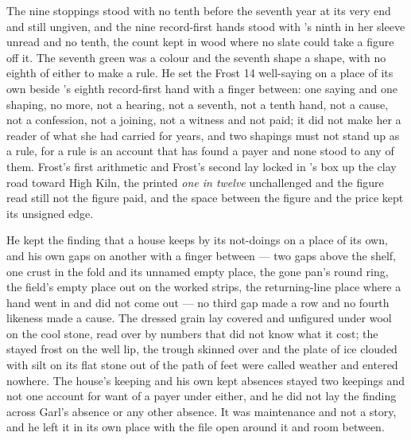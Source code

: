The nine stoppings stood with no tenth before the seventh year at its very end and still ungiven, and the nine record-first hands stood with 's ninth in her sleeve unread and no tenth, the count kept in wood where no slate could take a figure off it. The seventh green was a colour and the seventh shape a shape, with no eighth of either to make a rule. He set the Frost 14 well-saying on a place of its own beside 's eighth record-first hand with a finger between: one saying and one shaping, no more, not a hearing, not a seventh, not a tenth hand, not a cause, not a confession, not a joining, not a witness and not paid; it did not make her a reader of what she had carried for years, and two shapings must not stand up as a rule, for a rule is an account that has found a payer and none stood to any of them. Frost's first arithmetic and Frost's second lay locked in 's box up the clay road toward High Kiln, the printed \emph{one in twelve} unchallenged and the figure read still not the figure paid, and the space between the figure and the price kept its unsigned edge.

He kept the finding that a house keeps by its not-doings on a place of its own, and his own gaps on another with a finger between --- two gaps above the shelf, one crust in the fold and its unnamed empty place, the gone pan's round ring, the field's empty place out on the worked strips, the returning-line place where a hand went in and did not come out --- no third gap made a row and no fourth likeness made a cause. The dressed grain lay covered and unfigured under wool on the cool stone, read over by numbers that did not know what it cost; the stayed frost on the well lip, the trough skinned over and the plate of ice clouded with silt on its flat stone out of the path of feet were called weather and entered nowhere. The house's keeping and his own kept absences stayed two keepings and not one account for want of a payer under either, and he did not lay the finding across Garl's absence or any other absence. It was maintenance and not a story, and he left it in its own place with the file open around it and room between.

\scenebreak

